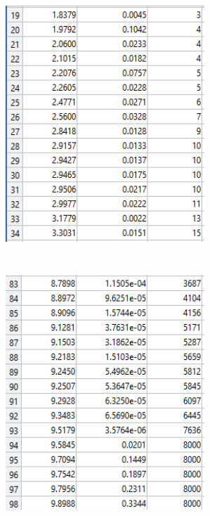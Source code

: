 \documentclass[12pt, letterpaper]{article}
\begin{document}
\includegraphics[height=10cm, width=75mm]{figure5.png}
\includegraphics[height=10cm, width=75mm]{figure6.png}
\vspace{10mm}
\\
\end{document}
